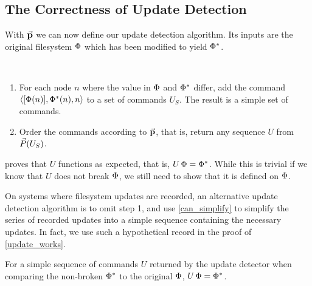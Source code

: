 
\subsection{The Correctness of Update Detection}

With $\mathrel{\vec{\mathbf{p}}}$ we can now define our update detection algorithm.
Its inputs are the original filesystem $\Phi$ which has been modified to yield $\Phi^*$.
\begin{mydef}~
\begin{enumerate}
    \item For each node $n$ where the value in $\Phi$ and $\Phi^*$ differ, add the command $\langle{[\Phi(n)],\Phi^*(n),n}\rangle$ to
        a set of commands $U_S$. The result is a simple set of commands.
    \item Order the commands according to $\mathrel{\vec{\mathbf{p}}}$, that is, 
        return any sequence $U$ from $\vec{P}({U_S})$.
\end{enumerate}
\end{mydef}

 proves that $U$ functions as expected, that is, $U\,\Phi=\Phi^*$.
While this is trivial if we know that $U$ does not break $\Phi$, we
still need to show that it is defined on $\Phi$.

On systems where filesystem updates are recorded,
an alternative update detection algorithm is to
omit step 1, and use \cref{can_simplify} to simplify the series of recorded updates
into a simple sequence containing the necessary updates.
In fact, we use such a hypothetical record in the proof of \cref{update_works}.


\begin{myth}
For a simple sequence of commands $U$ returned by the update detector
when comparing the non-broken $\Phi^*$ to the original $\Phi$,
$U\,\Phi = \Phi^*$.
\end{myth}

